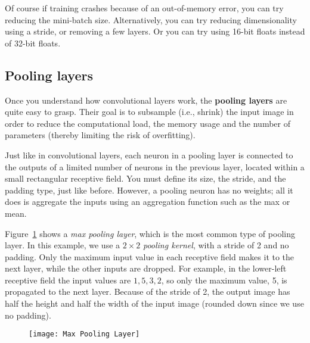 Of course if training crashes because of an out-of-memory error, you can try reducing the mini-batch size. Alternatively, you can try reducing dimensionality using a stride, or removing a few layers. Or you can try using 16-bit floats instead of 32-bit floats.
\subsection{Pooling layers}
Once you understand how convolutional layers work, the \textbf{pooling layers} are quite easy to grasp. Their goal is to subsample (i.e., shrink) the input image in order to reduce the computational load, the memory usage and the number of parameters (thereby limiting the risk of overfitting).

Just like in convolutional layers, each neuron in a pooling layer is connected to the outputs of a limited number of neurons in the previous layer, located within a small rectangular receptive field. You must define its size, the stride, and the padding type, just like before. However, a pooling neuron has no weights; all it does is aggregate the inputs using an aggregation function such as the max or mean.

Figure~\ref{Max_Pooling_Layer} shows a \emph{max pooling layer}, which is the most common type of pooling layer. In this example, we use a $2\times2$ \emph{pooling kernel}, with a stride of 2 and no padding. Only the maximum input value in each receptive field makes it to the next layer, while the other inputs are dropped. For example, in the lower-left receptive field the input values are $1, 5, 3, 2$, so only the maximum value, 5, is propagated to the next layer. Because of the stride of 2, the output image has half the height and half the width of the input image (rounded down since we use no padding).
\begin{figure}[!ht]
\centering
\texttt{[image: Max Pooling Layer]}
\caption{}\label{Max_Pooling_Layer}
\end{figure}

